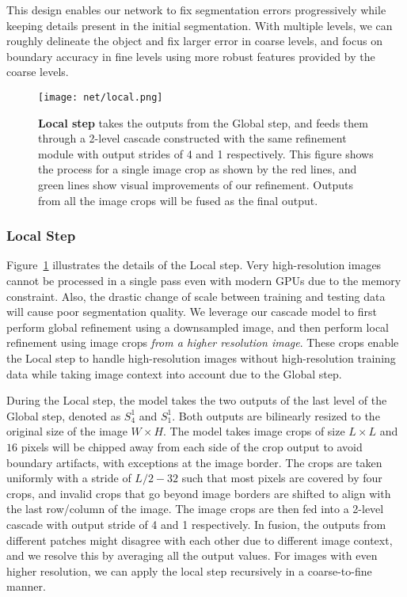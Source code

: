 \documentclass[10pt,twocolumn,letterpaper]{article}
\begin{document}
This design enables our network to fix segmentation errors progressively while keeping details present in the initial segmentation. 
With multiple levels, we can roughly delineate the object and fix larger error in coarse levels, and focus on boundary accuracy in fine levels using more robust features provided by the coarse levels. 

\begin{figure}[t]
\begin{center}
    \texttt{[image: net/local.png]}
\end{center}
    \vspace{-0.15in}
	\caption{\textbf{Local step} takes the outputs from the Global step, and feeds them through a 2-level cascade constructed with the same refinement module with output strides of 4 and 1 respectively. This figure shows the process for a single image crop as shown by the red lines, and green lines show visual improvements of our refinement. Outputs from all the image crops will be fused as the final output. 
	}
	\label{fig:local_fig}
	\vspace{-0.3in}
\end{figure}

\subsubsection{Local Step}
Figure~\ref{fig:local_fig} illustrates the details of the Local step.
Very high-resolution images cannot be processed in a single pass even with modern GPUs due to the memory constraint. Also, the drastic change of scale between training and testing data will cause poor segmentation quality. We leverage our cascade model to first perform global refinement using a downsampled image, and then perform local refinement using image crops {\em from a higher resolution image}. These crops enable the Local step to handle high-resolution images without high-resolution training data while taking image context into account due to the Global step.

During the Local step, the model takes the two outputs of the last level of the Global step, denoted as $S^1_4$ and $S^1_1$. Both outputs are bilinearly resized to the original size of the image $W\times H$.
The model takes image crops of size $L\times L$ and $16$ pixels will be chipped away from each side of the crop output to avoid boundary artifacts, with exceptions at the image border. The crops are taken uniformly with a stride of $L/2-32$ such that most pixels are covered by four crops, and invalid crops that go beyond image borders are shifted to align with the last row/column of the image.
The image crops are then fed into a 2-level cascade with output stride of 4 and 1 respectively.
In fusion, the outputs from different patches might disagree with each other due to different image context, and we resolve this by averaging all the output values. 
For images with even higher resolution, we can apply the local step recursively in a coarse-to-fine manner. 
\end{document}
